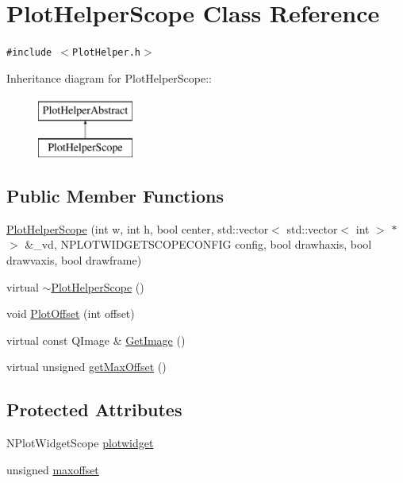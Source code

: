 \hypertarget{class_plot_helper_scope}{
\section{PlotHelperScope Class Reference}
\label{class_plot_helper_scope}
}
{\tt \#include $<$PlotHelper.h$>$}

Inheritance diagram for PlotHelperScope::\begin{figure}[H]
\begin{center}
\leavevmode
\includegraphics[height=2cm]{class_plot_helper_scope}
\end{center}
\end{figure}
\subsection*{Public Member Functions}
\begin{CompactItemize}
\item 
\hyperlink{class_plot_helper_scope_3c1b1aced962c1d2b82f1252253cfaed}{PlotHelperScope} (int w, int h, bool center, std::vector$<$ std::vector$<$ int $>$ $\ast$ $>$ \&\_\-vd, NPLOTWIDGETSCOPECONFIG config, bool drawhaxis, bool drawvaxis, bool drawframe)
\item 
virtual \hyperlink{class_plot_helper_scope_389451e3cc5caf2bc93c11089968b131}{$\sim$PlotHelperScope} ()
\item 
void \hyperlink{class_plot_helper_scope_841411e9c5faf41ee02b3c2e41ea8709}{PlotOffset} (int offset)
\item 
virtual const QImage \& \hyperlink{class_plot_helper_scope_14f9dd65241014d966dfade9ce51ade3}{GetImage} ()
\item 
virtual unsigned \hyperlink{class_plot_helper_scope_a57366f18a378b4c7517ee46e21ab31b}{getMaxOffset} ()
\end{CompactItemize}
\subsection*{Protected Attributes}
\begin{CompactItemize}
\item 
NPlotWidgetScope \hyperlink{class_plot_helper_scope_5297eb536d77915cbbe921d81e20b843}{plotwidget}
\item 
unsigned \hyperlink{class_plot_helper_scope_d17eedd76172d6862dc854619680c491}{maxoffset}
\end{CompactItemize}



